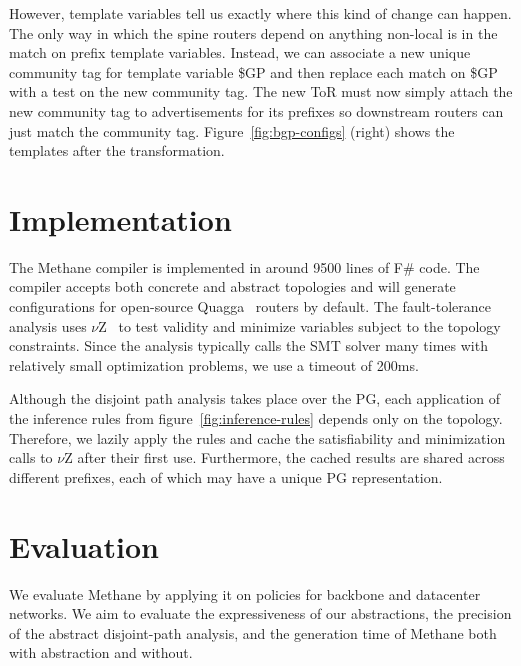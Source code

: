 \documentclass[numbers, 10pt, preprint]{sigplanconf}
\newcommand{\sysname}{{\small \sf Methane}\xspace}
\begin{document}
However, template variables tell us exactly where this kind of change can happen. The only way in which the spine routers depend on anything non-local is in the match on prefix template variables. Instead, we can associate a new unique community tag for template variable {\small \$GP} and then replace each match on {\small \$GP} with a test on the new community tag. The new ToR must now simply attach the new community tag to advertisements for its prefixes so downstream routers can just match the community tag. Figure~\ref{fig:bgp-configs} (right) shows the templates after the transformation.




%
%
%
%

\section{Implementation}
\label{sec:implementation}

The \sysname compiler is implemented in around 9500 lines of F\# code. The compiler accepts both concrete and abstract topologies and will generate configurations for open-source Quagga~\cite{quagga} routers by default. The fault-tolerance analysis uses $\nu$Z~\cite{z3opt} to test validity and minimize variables subject to the topology constraints. Since the analysis typically calls the SMT solver many times with relatively small optimization problems, we use a timeout of 200ms.

Although the disjoint path analysis takes place over the PG, each application of the inference rules from figure~\ref{fig:inference-rules} depends only on the topology. Therefore, we lazily apply the rules and cache the satisfiability and minimization calls to $\nu$Z after their first use. Furthermore, the cached results are shared across different prefixes, each of which may have a unique PG representation.

\section{Evaluation}
\label{sec:evaluation}

We evaluate \sysname by applying it on policies for backbone and datacenter networks. We aim to evaluate the expressiveness of our abstractions, the precision of the abstract disjoint-path analysis, and the generation time of \sysname both with abstraction and without.
\end{document}
